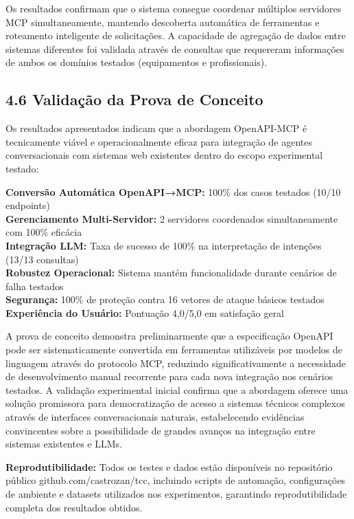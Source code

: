 \documentclass[
]{article}
\begin{document}
Os resultados confirmam que o sistema consegue coordenar múltiplos
servidores MCP simultaneamente, mantendo descoberta automática de
ferramentas e roteamento inteligente de solicitações. A capacidade de
agregação de dados entre sistemas diferentes foi validada através de
consultas que requereram informações de ambos os domínios testados
(equipamentos e profissionais).

\subsection{4.6 Validação da Prova de
Conceito}\label{validauxe7uxe3o-da-prova-de-conceito}

Os resultados apresentados indicam que a abordagem OpenAPI-MCP é
tecnicamente viável e operacionalmente eficaz para integração de agentes
conversacionais com sistemas web existentes dentro do escopo
experimental testado:

\textbf{Conversão Automática OpenAPI→MCP:} 100\% dos casos testados
(10/10 endpoints)\\
\textbf{Gerenciamento Multi-Servidor:} 2 servidores coordenados
simultaneamente com 100\% eficácia\\
\textbf{Integração LLM:} Taxa de sucesso de 100\% na interpretação de
intenções (13/13 consultas)\\
\textbf{Robustez Operacional:} Sistema mantém funcionalidade durante
cenários de falha testados\\
\textbf{Segurança:} 100\% de proteção contra 16 vetores de ataque
básicos testados\\
\textbf{Experiência do Usuário:} Pontuação 4,0/5,0 em satisfação geral

A prova de conceito demonstra preliminarmente que a especificação
OpenAPI pode ser sistematicamente convertida em ferramentas utilizáveis
por modelos de linguagem através do protocolo MCP, reduzindo
significativamente a necessidade de desenvolvimento manual recorrente
para cada nova integração nos cenários testados. A validação
experimental inicial confirma que a abordagem oferece uma solução
promissora para democratização de acesso a sistemas técnicos complexos
através de interfaces conversacionais naturais, estabelecendo evidências
convincentes sobre a possibilidade de grandes avanços na integração
entre sistemas existentes e LLMs.

\textbf{Reprodutibilidade:} Todos os testes e dados estão disponíveis no
repositório público github.com/castrozan/tcc, incluindo scripts de
automação, configurações de ambiente e datasets utilizados nos
experimentos, garantindo reprodutibilidade completa dos resultados
obtidos.
\end{document}

